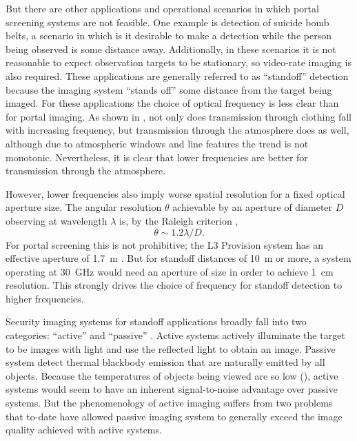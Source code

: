 But there are other applications and operational scenarios in which portal screening systems are not feasible.
One example is detection of suicide bomb belts, a scenario in which is it desirable to make a detection while the person being observed is some distance away.
Additionally, in these scenarios it is not reasonable to expect observation targets to be stationary, so video-rate imaging is also required.
These applications are generally referred to as ``standoff'' detection because the imaging system ``stands off'' some distance from the target being imaged.
For these applications the choice of optical frequency is less clear than for portal imaging.
As shown in , not only does transmission through clothing fall with increasing frequency, but transmission through the atmosphere does as well, although due to atmospheric windows and line features the trend is not monotonic.
Nevertheless, it is clear that lower frequencies are better for transmission through the atmosphere.

However, lower frequencies also imply worse spatial resolution for a fixed optical aperture size.
The angular resolution $\theta$ achievable by an aperture of diameter $D$ observing at wavelength $\lambda$ is, by the Raleigh criterion \cite{born_principles_1999},
\begin{equation} \label{eqn:ch1-raleigh}
  \theta \sim 1.2 \lambda / D.
\end{equation}
For portal screening this is not prohibitive; the L3 Provision system has an effective aperture of \SI{1.7}{\m} \cite{mcmakin_dual-surface_2009}.
But for standoff distances of \SI{10}{\m} or more, a system operating at \SI{30}{\GHz} would need an aperture of size  in order to achieve \SI{1}{\cm} resolution.
This strongly drives the choice of frequency for standoff detection to higher frequencies.

Security imaging systems for standoff applications broadly fall into two categories: ``active'' and ``passive'' \cite{appleby_standoff_2007,appleby_passive_2004}.
Active systems actively illuminate the target to be images with light and use the reflected light to obtain an image.
Passive system detect thermal blackbody emission that are naturally emitted by all objects.
Because the temperatures of objects being viewed are so low (), active systems would seem to have an inherent signal-to-noise advantage over passive systems.
But the phenomenology of active imaging suffers from two problems that to-date have allowed passive imaging system to generally exceed the image quality achieved with active systems.

